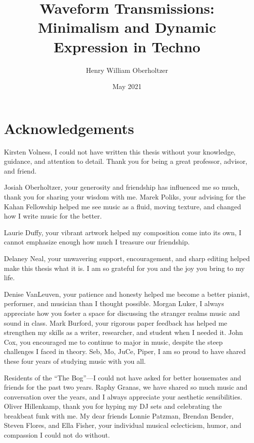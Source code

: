 \documentclass[12pt,twoside]{reedthesis}
\title{Waveform Transmissions: Minimalism and Dynamic Expression in Techno}
\author{Henry William Oberholtzer}
\date{May 2021}
\begin{document}
  \maketitle
  \frontmatter %
  \pagestyle{empty} %

    \chapter*{Acknowledgements}

Kirsten Volness, I could not have written this thesis without your knowledge, guidance, and attention to detail. Thank you for being a great professor, advisor, and friend.

Josiah Oberholtzer, your generosity and friendship has influenced me so much, thank you for sharing your wisdom with me. Marek Poliks, your advising for the Kahan Fellowship helped me see music as a fluid, moving texture, and changed how I write music for the better. 

Laurie Duffy, your vibrant artwork helped my composition come into its own, I cannot emphasize enough how much I treasure our friendship. 

Delaney Neal, your unwavering support, encouragement, and sharp editing helped make this thesis what it is. I am so grateful for you and the joy you bring to my life.

Denise VanLeuven, your patience and honesty helped me become a better pianist, performer, and musician than I thought possible. Morgan Luker, I always appreciate how you foster a space for discussing the stranger realms music and sound in class. Mark Burford, your rigorous paper feedback has helped me strengthen my skills as a writer, researcher, and student when I needed it. John Cox, you encouraged me to continue to major in music, despite the steep challenges I faced in theory. Seb, Mo, JuCe, Piper, I am so proud to have shared these four years of studying music with you all.

Residents of the ``The Bog''---I could not have asked for better housemates and friends for the past two years. Raphy Granas, we have shared so much music and conversation over the years, and I always appreciate your aesthetic sensibilities. Oliver Hillenkamp, thank you for hyping my DJ sets and celebrating the breakbeat funk with me. My dear friends Lonnie Patzman, Brendan Bender, Steven Flores, and Ella Fisher, your individual musical eclecticism, humor, and compassion I could not do without.
\end{document}
